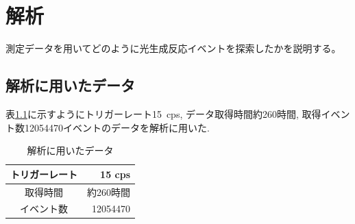 \chapter{解析}\label{analysis}
測定データを用いてどのように光生成反応イベントを探索したかを説明する。

\section{解析に用いたデータ}\label{sec:anal:data}
表\ref{tab:analyzed_data}に示すようにトリガーレート15\ cps, データ取得時間約260時間, 取得イベント数12054470イベントのデータを解析に用いた.
\begin{table}[H]
    \centering
    \caption{解析に用いたデータ}
    \label{tab:analyzed_data}
    \begin{tabular}{|c|r|}
        \hline
        トリガーレート & 15 cps    \\ \hline
        取得時間       & 約260時間 \\ \hline
        イベント数     & 12054470  \\ \hline
    \end{tabular}
\end{table}

